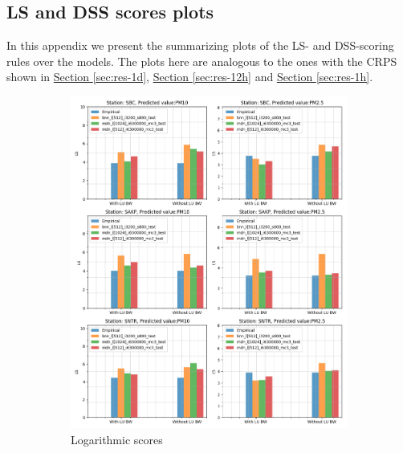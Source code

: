 \documentclass[12pt,a4paper,twoside]{scrartcl}
\numberwithin{equation}{section}
\newcommand{\refsec}[1]{\hyperref[#1]{Section \ref*{#1}}}
\newcounter{mypagecount}%
\newenvironment{interlude}{%
  \clearpage
  \setcounter{mypagecount}{\value{page}}%
  \thispagestyle{empty}%
  \pagestyle{empty}%
}{%
  \clearpage
  \setcounter{page}{\value{mypagecount}}%
}
\let\chapter=\section %
\begin{document}
\begin{interlude}
\begin{appendices}
    \chapter{LS and DSS scores plots}\label{app:c}
    In this appendix we present the summarizing plots of the LS- and DSS-scoring rules over the models. The plots here are analogous to the ones with the CRPS shown in \refsec{sec:res-1d}, \refsec{sec:res-12h} and \refsec{sec:res-1h}.
    \begin{figure}[h!]
      \centering
      \begin{subfigure}[t]{0.49\textwidth}
        \includegraphics[width=\textwidth,height=1.2\textwidth]{figures/figs_1d/results_plot_LS}%
        \caption{Logarithmic scores}
      \end{subfigure}
      \begin{subfigure}[t]{0.49\textwidth}

\end{subfigure}
\end{figure}
\end{appendices}
\end{interlude}
\end{document}
